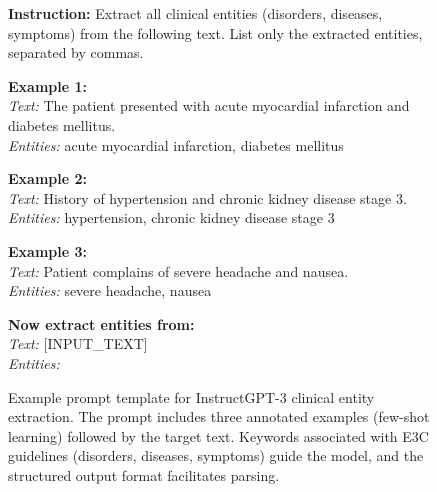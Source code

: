 \begin{figure}[!ht]
\centering
\begin{modelinput}
\small
\textbf{Instruction:} Extract all clinical entities (disorders, diseases, symptoms) from the following text. List only the extracted entities, separated by commas.

\textbf{Example 1:}\\
\textit{Text:} The patient presented with acute myocardial infarction and diabetes mellitus.\\
\textit{Entities:} acute myocardial infarction, diabetes mellitus

\textbf{Example 2:}\\
\textit{Text:} History of hypertension and chronic kidney disease stage 3.\\
\textit{Entities:} hypertension, chronic kidney disease stage 3

\textbf{Example 3:}\\
\textit{Text:} Patient complains of severe headache and nausea.\\
\textit{Entities:} severe headache, nausea

\textbf{Now extract entities from:}\\
\textit{Text:} [INPUT\_TEXT]\\
\textit{Entities:}
\end{modelinput}
\caption{Example prompt template for InstructGPT-3 clinical entity extraction. The prompt includes three annotated examples (few-shot learning) followed by the target text. Keywords associated with E3C guidelines (disorders, diseases, symptoms) guide the model, and the structured output format facilitates parsing.}
\label{fig:prompt}
\end{figure}
